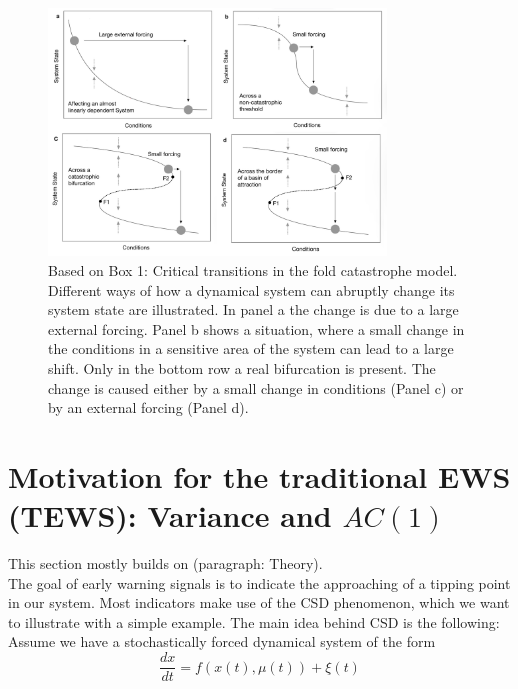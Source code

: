 \documentclass[%
thesis=student,%
coverpage=false,%
titlepage=false,%
headmarks=true, %
english,%
font=libertine, %
math=newpxtx, %
BCOR=5mm,%
coverBCOR=11mm%
]{tumbook}
\begin{document}
\begin{figure}[t]
    \centering
    \includegraphics[width=0.8\textwidth]{bachelor-thesis/figures/scheffer_box_1.jpg}
    \caption{Based on \cite{Scheffer:2009} Box 1: Critical transitions in the fold catastrophe model. Different ways of how a dynamical system can abruptly change its system state are illustrated. In panel a the change is due to a large external forcing. Panel b shows a situation, where a small change in the conditions in a sensitive area of the system can lead to a large shift. Only in the bottom row a real bifurcation is present. The change is caused either by a small change in conditions (Panel c) or by an external forcing (Panel d).}
    \label{fig:Critical transitions in the fold catastrophe mode}
\end{figure}


\section{Motivation for the traditional EWS (TEWS): Variance and $AC(1)$}
\label{sec: Motivation for the traditional EWS: Variance and $AC(1)$}

This section mostly builds on \cite{Scheffer:2009}(paragraph: Theory).\\
The goal of early warning signals is to indicate the approaching of a tipping point in our system. Most indicators make use of the CSD phenomenon, which we want to illustrate with a simple example. The main idea behind CSD is the following: Assume we have a stochastically forced dynamical system of the form 
\begin{equation}
    \frac{dx}{dt} = f(x(t),\mu(t)) + \xi (t) 
    \label{stochastically forced system}
\end{equation}
\end{document}
